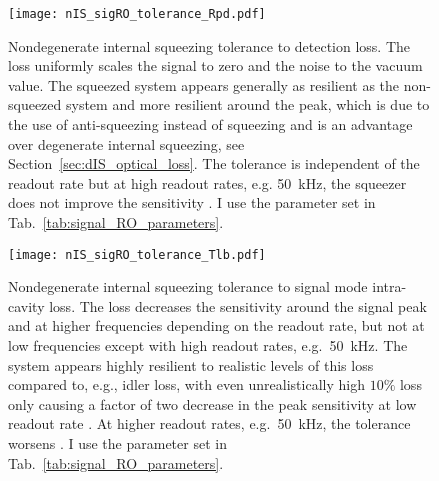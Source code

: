 \begin{figure}
    \centering
    \texttt{[image: nIS\_sigRO\_tolerance\_Rpd.pdf]}
    \caption{ Nondegenerate internal squeezing tolerance to detection loss. The loss uniformly scales the signal to zero and the noise to the vacuum value. The squeezed system appears generally as resilient as the non-squeezed system and more resilient around the peak, which is due to the use of anti-squeezing instead of squeezing and is an advantage over degenerate internal squeezing, see Section~\ref{sec:dIS_optical_loss}. The tolerance is independent of the readout rate but at high readout rates, e.g. 50~kHz, the squeezer does not improve the sensitivity . I use the parameter set in Tab.~\ref{tab:signal_RO_parameters}.}
    \label{fig:nIS_sigRO_tolerance_Rpd}
\end{figure}
\begin{figure}
    \centering
    \texttt{[image: nIS\_sigRO\_tolerance\_Tlb.pdf]}
    \caption{ Nondegenerate internal squeezing tolerance to signal mode intra-cavity loss. The loss decreases the sensitivity around the signal peak and at higher frequencies depending on the readout rate, but not at low frequencies except with high readout rates, e.g.\ 50~kHz. The system appears highly resilient to realistic levels of this loss compared to, e.g., idler loss, with even unrealistically high $10\%$ loss only causing a factor of two decrease in the peak sensitivity at low readout rate . At higher readout rates, e.g.\ 50~kHz, the tolerance worsens . I use the parameter set in Tab.~\ref{tab:signal_RO_parameters}.
    }
    \label{fig:nIS_sigRO_tolerance_Tlb}
\end{figure}
